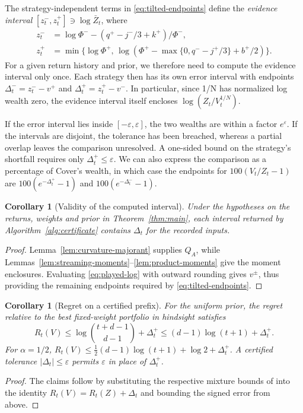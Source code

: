 \documentclass{article}
\numberwithin{equation}{section}
\newcounter{algorithm}
\newtheorem{corollary}[theorem]{Corollary}
\theoremstyle{remark}
\begin{document}
The strategy-independent terms in \eqref{eq:tilted-endpoints} define the
\emph{evidence interval} $[z_t^-,z_t^+]\ni\log\bar Z_t$, where
\begin{align*}
 z_t^- &= \log\Phi^--(q^+-j^-/3+k^+)/\Phi^-,\\
 z_t^+ &= \min\{\log\Phi^+,\,
       \log(\Phi^+-\max\{0,q^- - j^+/3\}+b^+/2)\}.
\end{align*}
For a given return history and prior, we therefore need to compute the
evidence interval only once. Each strategy then has its own error interval
with endpoints $\Delta_t^-=z_t^- -v^+$ and $\Delta_t^+=z_t^+ -v^-$.
In particular, since 1/N has normalized log wealth zero, the evidence
interval itself encloses $\log(Z_t/V_t^{1/N})$.

If the error interval lies inside $[-\varepsilon,\varepsilon]$, the two
wealths are within a factor $e^\varepsilon$. If the intervals are disjoint,
the tolerance has been breached, whereas a partial overlap leaves the
comparison unresolved. A one-sided bound on the strategy's shortfall
requires only $\Delta_t^+\le\varepsilon$. We can also express the
comparison as a percentage of Cover's wealth, in which case the endpoints
for $100(V_t/Z_t-1)$ are $100(e^{-\Delta_t^+}-1)$ and
$100(e^{-\Delta_t^-}-1)$.

\begin{corollary}[Validity of the computed interval]\label{cor:algorithm}
Under the hypotheses on the returns, weights and prior in
Theorem~\ref{thm:main}, each interval returned by
Algorithm~\ref{alg:certificate} contains $\Delta_t$ for the recorded inputs.
\end{corollary}
\begin{proof}
Lemma~\ref{lem:curvature-majorant} supplies $Q_A$, while
Lemmas~\ref{lem:streaming-moments}--\ref{lem:product-moments} give the
moment enclosures. Evaluating \eqref{eq:played-log} with outward
rounding gives $v^\pm$, thus providing the remaining endpoints required
by \eqref{eq:tilted-endpoints}.
\end{proof}

\begin{corollary}[Regret on a certified prefix]\label{cor:prefix-regret}
For the uniform prior, the regret relative to the best fixed-weight
portfolio in hindsight satisfies
\[
 R_t(V)\le\log\binom{t+d-1}{d-1}+\Delta_t^+
        \le(d-1)\log(t+1)+\Delta_t^+ .
\]
For $\alpha=1/2$, $R_t(V)\le\tfrac12(d-1)\log(t+1)+\log 2+\Delta_t^+$.
A certified tolerance $|\Delta_t|\le\varepsilon$ permits $\varepsilon$
in place of $\Delta_t^+$.
\end{corollary}
\begin{proof}
The claims follow by substituting the respective mixture bounds of
\citet[Theorems~1 and~2]{coverordentlich1996} into the identity
$R_t(V)=R_t(Z)+\Delta_t$ and bounding the signed error from above.
\end{proof}
\end{document}
